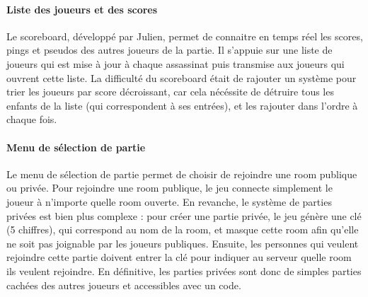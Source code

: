         \paragraph{Liste des joueurs et des scores}

            Le scoreboard, développé par Julien, permet de connaitre en temps réel les scores, pings et pseudos des autres joueurs de la partie. 
            Il s'appuie sur une liste de joueurs qui est mise à jour à chaque assassinat puis transmise aux joueurs qui ouvrent cette liste. 
            La difficulté du scoreboard était de rajouter un système pour trier les joueurs par score décroissant, car cela nécéssite de 
            détruire tous les enfants de la liste (qui correspondent à ses  entrées), et les rajouter dans l'ordre à chaque fois.

        \paragraph{Menu de sélection de partie}

            Le menu de sélection de partie permet de choisir de rejoindre une room publique ou privée. Pour rejoindre une room publique, le jeu 
            connecte simplement le joueur à n'importe quelle room ouverte. En revanche, le système de parties privées est bien plus complexe :
            pour créer une partie privée, le jeu génère une clé (5 chiffres), qui correspond au nom de la room, et masque cette room afin qu'elle 
            ne soit pas joignable par les joueurs publiques. Ensuite, les personnes qui veulent rejoindre cette partie doivent entrer la clé pour 
            indiquer au serveur quelle room ils veulent rejoindre. En définitive, les parties privées sont donc de simples parties cachées des autres 
            joueurs et accessibles avec un code.

        